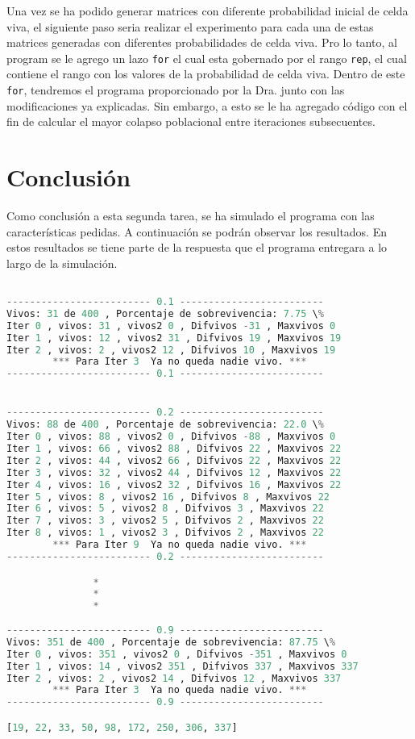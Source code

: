 \documentclass{article}
\begin{document}
Una vez se ha podido generar matrices con diferente probabilidad inicial de celda viva, el siguiente  paso seria realizar el experimento para cada una de estas matrices generadas con diferentes probabilidades de celda viva. Pro lo tanto, al program se le agrego un lazo \texttt{for} el cual esta gobernado por el rango \texttt{rep}, el cual contiene el rango con los valores de la probabilidad de celda viva. Dentro de este \texttt{for}, tendremos el programa proporcionado por la Dra. \citet{Ejem} junto con las modificaciones ya explicadas. Sin embargo, a esto se le ha agregado código con el fin de calcular el mayor colapso poblacional entre iteraciones subsecuentes.


\section{Conclusión}

Como conclusión a esta segunda tarea, se ha simulado el programa con las características pedidas.  A continuación se podrán observar los resultados. En estos resultados se tiene parte de la respuesta que el programa entregara a lo largo de la simulación. 

\begin{lstlisting}[language=Python]

------------------------- 0.1 -------------------------
Vivos: 31 de 400 , Porcentaje de sobrevivencia: 7.75 \%
Iter 0 , vivos: 31 , vivos2 0 , Difvivos -31 , Maxvivos 0
Iter 1 , vivos: 12 , vivos2 31 , Difvivos 19 , Maxvivos 19
Iter 2 , vivos: 2 , vivos2 12 , Difvivos 10 , Maxvivos 19
        *** Para Iter 3  Ya no queda nadie vivo. ***
------------------------- 0.1 -------------------------


------------------------- 0.2 -------------------------
Vivos: 88 de 400 , Porcentaje de sobrevivencia: 22.0 \%
Iter 0 , vivos: 88 , vivos2 0 , Difvivos -88 , Maxvivos 0
Iter 1 , vivos: 66 , vivos2 88 , Difvivos 22 , Maxvivos 22
Iter 2 , vivos: 44 , vivos2 66 , Difvivos 22 , Maxvivos 22
Iter 3 , vivos: 32 , vivos2 44 , Difvivos 12 , Maxvivos 22
Iter 4 , vivos: 16 , vivos2 32 , Difvivos 16 , Maxvivos 22
Iter 5 , vivos: 8 , vivos2 16 , Difvivos 8 , Maxvivos 22
Iter 6 , vivos: 5 , vivos2 8 , Difvivos 3 , Maxvivos 22
Iter 7 , vivos: 3 , vivos2 5 , Difvivos 2 , Maxvivos 22
Iter 8 , vivos: 1 , vivos2 3 , Difvivos 2 , Maxvivos 22
        *** Para Iter 9  Ya no queda nadie vivo. ***
------------------------- 0.2 -------------------------

			   *
			   *
			   *
				
------------------------- 0.9 -------------------------
Vivos: 351 de 400 , Porcentaje de sobrevivencia: 87.75 \%
Iter 0 , vivos: 351 , vivos2 0 , Difvivos -351 , Maxvivos 0
Iter 1 , vivos: 14 , vivos2 351 , Difvivos 337 , Maxvivos 337
Iter 2 , vivos: 2 , vivos2 14 , Difvivos 12 , Maxvivos 337
        *** Para Iter 3  Ya no queda nadie vivo. ***
------------------------- 0.9 -------------------------

[19, 22, 33, 50, 98, 172, 250, 306, 337]
\end{lstlisting}  
\end{document}
